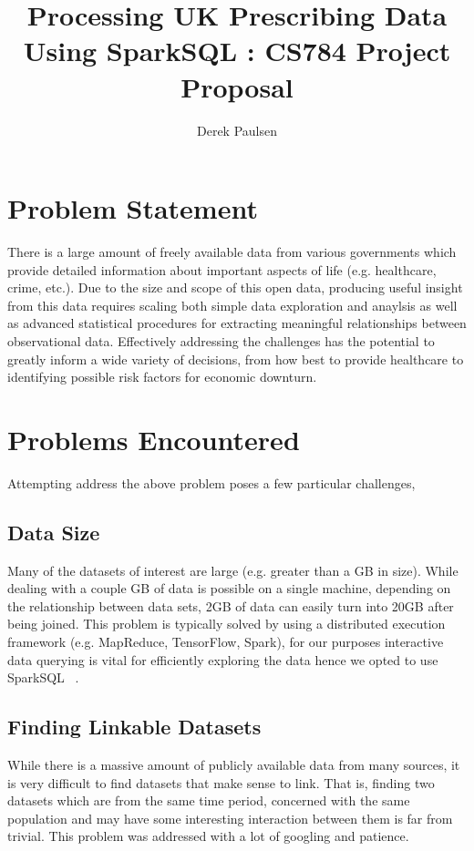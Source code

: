 \documentclass[a4paper]{article}
\author{Derek Paulsen}
\title{Processing UK Prescribing Data Using SparkSQL : CS784 Project Proposal}
\begin{document}
\maketitle
\section{Problem Statement}
	There is a large amount of freely available data from various governments which provide detailed information 
	about important aspects of life (e.g. healthcare, crime, etc.). Due to the size and scope of this open data, 
	producing useful insight from this data requires scaling both simple data exploration and anaylsis as well as
	advanced statistical procedures for extracting meaningful relationships between observational data. Effectively 
	addressing the challenges has the potential to greatly inform a wide variety of decisions, from how best to 
	provide healthcare to identifying possible risk factors for economic downturn.
	

\section{Problems Encountered}
	Attempting address the above problem poses a few particular challenges,

	\subsection{Data Size}
		Many of the datasets of interest are large (e.g. greater than a GB in size). While dealing with a couple GB of data
		is possible on a single machine, depending on the relationship between data sets, 2GB of data can easily turn into
		20GB after being joined. This problem is typically solved by using a 
		distributed execution framework (e.g. MapReduce, TensorFlow, Spark), for our purposes interactive data querying is 
		vital for efficiently exploring the data hence we opted to use SparkSQL ~\cite{ref:SparkSQL}.

	\subsection{Finding Linkable Datasets}
		While there is a massive amount of publicly available data from many sources, it is very difficult to find 
		datasets that make sense to link. That is, finding two datasets which are from the same time period, concerned with 
		the same population and may have some interesting interaction between them is far from trivial. This problem 
		was addressed with a lot of googling and patience. %
\end{document}

